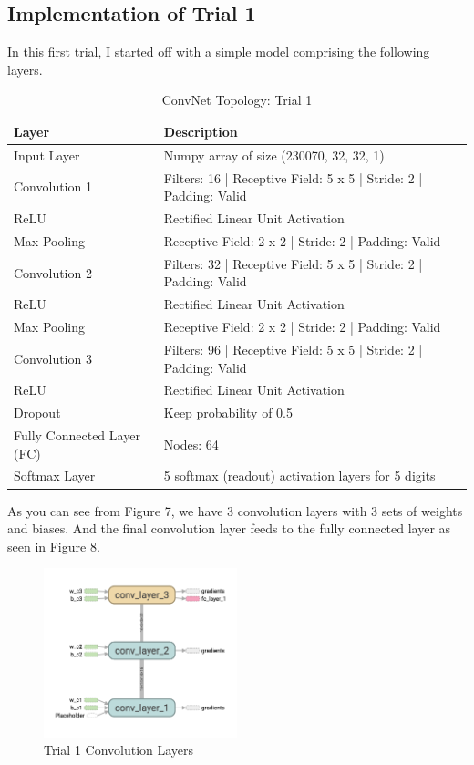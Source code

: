 \documentclass[twoside, column]{article}
\begin{document}
\subsection{Implementation of Trial 1}

In this first trial, I started off with a simple model comprising the following layers. 

\begin{table}[htp]
\caption{ConvNet Topology: Trial 1}
\begin{center}
\begin{tabular}{llr}

\cmidrule(r){1-2}
Layer & Description \\
\midrule
Input Layer & Numpy array of size (230070, 32, 32, 1)\\
Convolution 1 & Filters: 16 | Receptive Field: 5 x 5 | Stride: 2 | Padding: Valid\\
ReLU & Rectified Linear Unit Activation\\
Max Pooling & Receptive Field: 2 x 2 | Stride: 2 | Padding: Valid\\
Convolution 2 & Filters: 32 | Receptive Field: 5 x 5 | Stride: 2 | Padding: Valid\\
ReLU & Rectified Linear Unit Activation\\
Max Pooling & Receptive Field: 2 x 2 | Stride: 2 | Padding: Valid\\
Convolution 3 & Filters: 96 | Receptive Field: 5 x 5 | Stride: 2 | Padding: Valid\\
ReLU & Rectified Linear Unit Activation\\
Dropout & Keep probability of 0.5\\
Fully Connected Layer (FC) & Nodes: 64\\
Softmax Layer & 5 softmax (readout) activation layers for 5 digits\\

\end{tabular}
\end{center}
\label{default}
\end{table}

As you can see from Figure 7, we have 3 convolution layers with 3 sets of weights and biases. And the final convolution layer feeds to the fully connected layer as seen in Figure 8.

\begin{figure}
\caption{Trial 1 Convolution Layers}
\centering
\includegraphics[width=0.5\textwidth]{conv_trial_1}
\end{figure}
\end{document}
